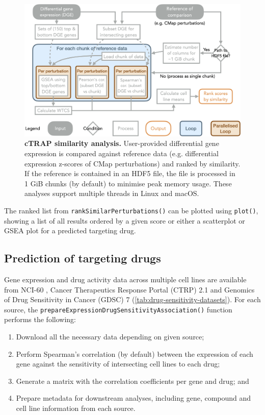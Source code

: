 \begin{figure}[!h]
  \includegraphics[width=.8\textwidth]{images/ctrap/analysis}
  \centering
  \caption[cTRAP similarity analysis]{\textbf{cTRAP similarity analysis.} User-provided differential gene expression is compared against reference data (e.g. differential expression z-scores of CMap perturbations) and ranked by similarity. If the reference is contained in an HDF5 file, the file is processed in 1 GiB chunks (by default) to minimise peak memory usage. These analyses support multiple threads in Linux and macOS.}
  \label{fig:ctrap-analyses}
\end{figure}

The ranked list from \texttt{rankSimilarPerturbations()} can be plotted using \texttt{plot()}, showing a list of all results ordered by a given score or either a scatterplot or GSEA plot for a predicted targeting drug.

\subsection{Prediction of targeting drugs}

Gene expression and drug activity data across multiple cell lines are available from NCI-60 \cite{shoemaker:2006wi}, Cancer Therapeutics Response Portal (CTRP) 2.1 \cite{seashore-ludlow:2015ws} and Genomics of Drug Sensitivity in Cancer (GDSC) 7 \cite{yang:2012vk} (\autoref{tab:drug-sensitivity-datasets}). For each source, the \texttt{prepareExpressionDrugSensitivityAssociation()} function performs the following:

\begin{enumerate}
	\item Download all the necessary data depending on given source;
	\item Perform Spearman’s correlation (by default) between the expression of each gene against the sensitivity of intersecting cell lines to each drug;
	\item Generate a matrix with the correlation coefficients per gene and drug; and
	\item Prepare metadata for downstream analyses, including gene, compound and cell line information from each source.
\end{enumerate}


